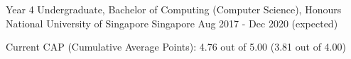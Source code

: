 

\begin{cventries}

  \cventry
  {Year 4 Undergraduate, Bachelor of Computing (Computer Science), Honours} %
  {National University of Singapore} %
  {Singapore} %
  {Aug 2017 - Dec 2020 (expected)} %
  {
    \begin{cvitems} %
      \item {Current CAP (Cumulative Average Points): 4.76 out of 5.00 (3.81 out of 4.00)}
    \end{cvitems}
  }




\end{cventries}
